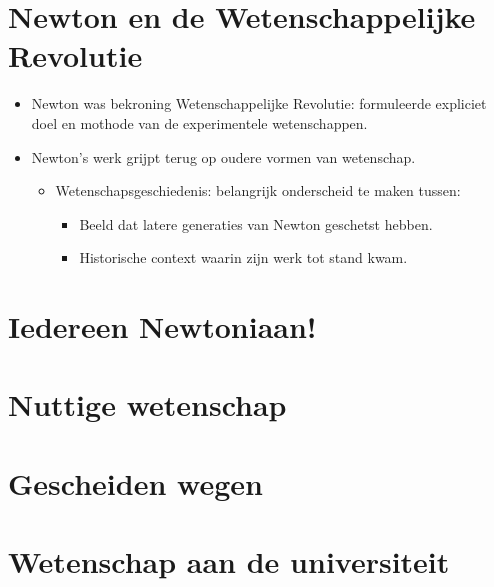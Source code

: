 \documentclass{article}
\begin{document}
  \section{Newton en de Wetenschappelijke Revolutie}
    \begin{itemize}
      \item Newton was bekroning Wetenschappelijke Revolutie: formuleerde expliciet doel en mothode van de experimentele wetenschappen.
      \item Newton's werk grijpt terug op oudere vormen van wetenschap.
      \begin{itemize}
        \item Wetenschapsgeschiedenis: belangrijk onderscheid te maken tussen:
        \begin{itemize}
          \item Beeld dat latere generaties van Newton geschetst hebben.
          \item Historische context waarin zijn werk tot stand kwam.
        \end{itemize}
      \end{itemize}
    \end{itemize}

  \newpage
  \section{Iedereen Newtoniaan!}

  \newpage
  \section{Nuttige wetenschap}

  \newpage
  \section{Gescheiden wegen}

  \newpage
  \section{Wetenschap aan de universiteit}
\end{document}
